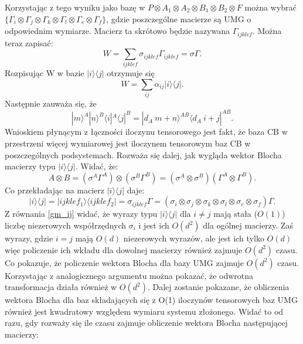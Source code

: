 \documentclass[10pt]{article} %
\newcommand{\Ket}[1]{|#1\rangle}
\newcommand{\Bra}[1]{\langle#1|}
\begin{document}
\begin{appendices}
Korzystając z tego wyniku jako bazę w $P \otimes A_1 \otimes A_2 \otimes B_1 \otimes B_2 \otimes F$ można wybrać $\{ \Gamma_i \otimes \Gamma_j \otimes \Gamma_k \otimes \Gamma_l \otimes \Gamma_e \otimes \Gamma_f\}$, gdzie poszczególne macierze są UMG o odpowiednim wymiarze. Macierz ta skrótowo będzie nazywana $\Gamma_{ijklef}$.
Można teraz zapisać:
\begin{equation}
\label{WGM}
W = \sum_{ijklef} \sigma_{ijklef} \Gamma_{ijklef} = \sigma \Gamma.
\end{equation}
Rozpisując W w bazie $\Ket{i}\Bra{j}$ otrzymuje się
\begin{equation}
W = \sum_{ij} \alpha_{ij} \Ket{i}\Bra{j}.
\end{equation}
Następnie zauważa się, że
\begin{equation}
\Ket{m}^A\Ket{n}^B\Bra{i}^A\Bra{j}^B = \Ket{d_A~m+n}^{AB}\Bra{d_A~i+j}^{AB}.
\end{equation} Wnioskiem płynącym z łączności iloczynu tensorowego jest fakt, że baza CB w przestrzeni więcej wymiarowej jest iloczynem tensorowym baz CB w poszczególnych podsystemach.
Rozważa się dalej, jak wygląda wektor Blocha macierzy typu $\Ket{i}\Bra{j}$.
Widać, że:
\begin{equation}
A \otimes B = (\sigma^A \Gamma^A) \otimes (\sigma^B \Gamma^B) = (\sigma^A \otimes \sigma^B) (\Gamma^A \otimes \Gamma^B).
\end{equation} Co przekładając na macierz $\Ket{i}\Bra{j}$ daje:
\begin{equation}
\Ket{i}\Bra{j}=\Ket{ijklef_1}\Bra{ijklef_2} =  \sigma_{ijklef} \Gamma = (\sigma_i \otimes \sigma_j \otimes \sigma_k \otimes \sigma_l \otimes \sigma_e \otimes \sigma_f) \Gamma.
\end{equation}
Z równania \eqref{gm_ij} widać, że wyrazy typu $\Ket{i}\Bra{j}$ dla $i \neq j$ mają stała ($O(1)$) liczbę niezerowych współrzędnych $\sigma_i$ i jest ich $O(d^2)$ dla ogólnej macierzy. Zaś wyrazy, gdzie $i = j$ mają $O(d)$ niezerowych wyrazów, ale jest ich tylko $O(d)$ więc policzenie ich wkładu dla dowolnej macierzy również zajmuje 
$O(d^2)$ czasu. Co pokazuje, że policzenie wektora Blocha dla bazy UMG zajmuje $O(d^2)$ czasu. Korzystając z analogicznego argumentu można pokazać, że odwrotna transformacja działa również w $O(d^2)$. Dalej zostanie pokazane, że obliczenia wektora Blocha dla baz składających się z O(1) iloczynów tensorowych baz UMG również jest kwadratowy względem wymiaru systemu złożonego. Widać to od razu, gdy rozważy się ile czasu zajmuje obliczenie wektora Blocha następującej macierzy:

\end{appendices}
\end{document}
